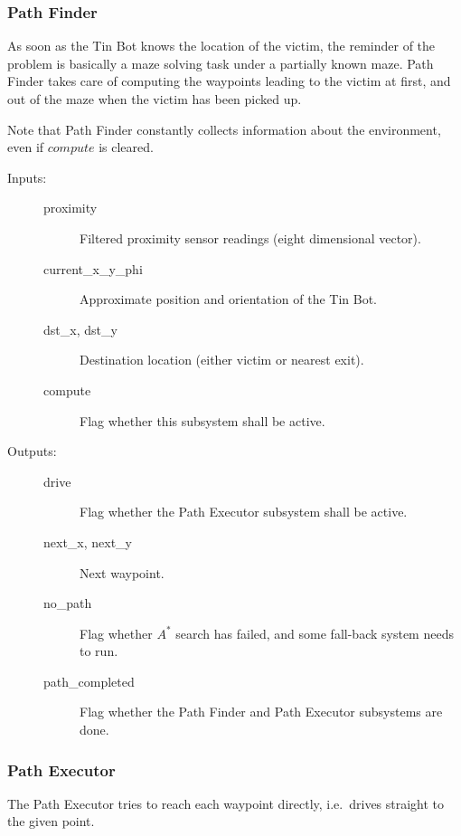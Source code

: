 \documentclass[a4paper,parskip,headheight=38pt]{scrartcl} %
\begin{document}
\subsubsection{Path Finder}
As soon as the Tin Bot knows the location of the victim, the reminder of the problem is basically a maze solving task under a partially known maze. 
Path Finder takes care of computing the waypoints leading to the victim at first, and out of the maze when the victim has been picked up. 

Note that Path Finder constantly collects information about the environment, even if $compute$ is cleared.

\begin{description}
\item[Inputs:] \hfill
    \begin{description}
    \item[proximity] Filtered proximity sensor readings (eight dimensional vector).
    \item[current\_x\_y\_phi] Approximate position and orientation of the Tin Bot.
  	\item[dst\_x, dst\_y] Destination location (either victim or nearest exit).
    \item[compute] Flag whether this subsystem shall be active.
	\end{description}
\item[Outputs:] \hfill
	\begin{description}
    \item[drive] Flag whether the Path Executor subsystem shall be active.
    \item[next\_x, next\_y] Next waypoint.
    \item[no\_path] Flag whether $A^\ast$ search has failed, and some fall-back system needs to run.
    \item[path\_completed] Flag whether the Path Finder and Path Executor subsystems are done.
	\end{description}
\end{description}

\subsubsection{Path Executor}

The Path Executor tries to reach each waypoint directly, i.e.\ drives straight to the given point. 
\end{document}
